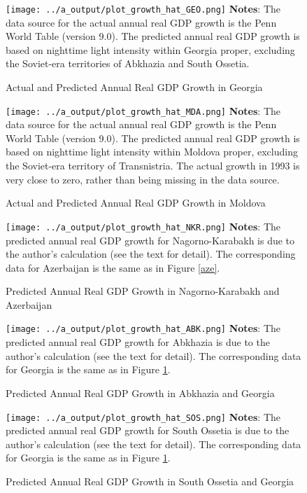 \documentclass[12pt,a4paper]{article}%
\begin{document}
\begin{figure}[ptb]
\caption{Actual and Predicted Annual Real GDP Growth in Georgia}
\texttt{[image: ../a\_output/plot\_growth\_hat\_GEO.png]}
\label{geo}%
{\scriptsize \textbf{Notes}: 
	The data source for the actual annual real GDP growth is the Penn World Table (version 9.0). 
	The predicted annual real GDP growth is based on nighttime light intensity within Georgia proper, excluding the Soviet-era territories of Abkhazia and South Ossetia. 
}
\end{figure}

\begin{figure}[ptb]
\caption{Actual and Predicted Annual Real GDP Growth in Moldova}
\texttt{[image: ../a\_output/plot\_growth\_hat\_MDA.png]}
\label{mda}%
{\scriptsize \textbf{Notes}: 
	The data source for the actual annual real GDP growth is the Penn World Table (version 9.0). 
	The predicted annual real GDP growth is based on nighttime light intensity within Moldova proper, excluding the Soviet-era territory of Transnistria. 
	The actual growth in 1993 is very close to zero, rather than being missing in the data source.
}
\end{figure}

\begin{figure}[ptb]
\caption{Predicted Annual Real GDP Growth in Nagorno-Karabakh and Azerbaijan}
\texttt{[image: ../a\_output/plot\_growth\_hat\_NKR.png]}
\label{nkr}%
{\scriptsize \textbf{Notes}: 
	The predicted annual real GDP growth for Nagorno-Karabakh is due to the author's calculation (see the text for detail).
	The corresponding data for Azerbaijan is the same as in Figure \ref{aze}.
}
\end{figure}

\begin{figure}[ptb]
\caption{Predicted Annual Real GDP Growth in Abkhazia and Georgia}
\texttt{[image: ../a\_output/plot\_growth\_hat\_ABK.png]}
\label{abk}%
{\scriptsize \textbf{Notes}: 
	The predicted annual real GDP growth for Abkhazia is due to the author's calculation (see the text for detail).
	The corresponding data for Georgia is the same as in Figure \ref{geo}.
}
\end{figure}

\begin{figure}[ptb]
\caption{Predicted Annual Real GDP Growth in South Ossetia and Georgia}
\texttt{[image: ../a\_output/plot\_growth\_hat\_SOS.png]}
\label{sos}%
{\scriptsize \textbf{Notes}: 
	The predicted annual real GDP growth for South Ossetia is due to the author's calculation (see the text for detail).
	The corresponding data for Georgia is the same as in Figure \ref{geo}.
}
\end{figure}
\end{document}
